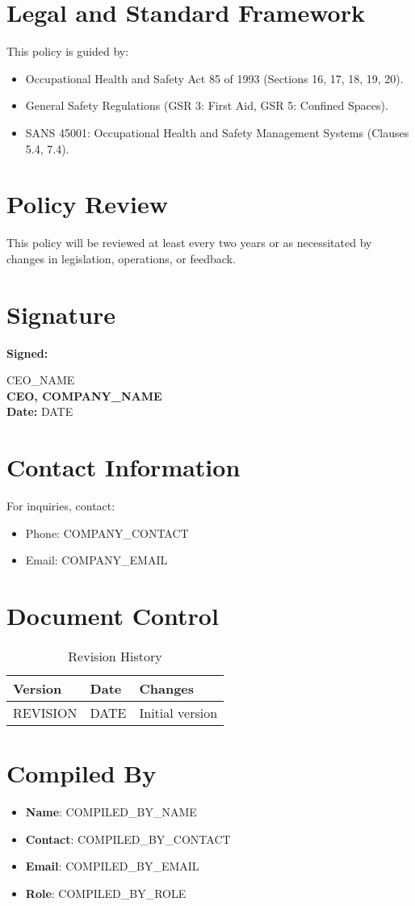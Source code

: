 \documentclass[12pt]{article}
\begin{document}
\section{Legal and Standard Framework}
This policy is guided by:
\begin{itemize}
    \item Occupational Health and Safety Act 85 of 1993 (Sections 16, 17, 18, 19, 20).
    \item General Safety Regulations (GSR 3: First Aid, GSR 5: Confined Spaces).
    \item SANS 45001: Occupational Health and Safety Management Systems (Clauses 5.4, 7.4).
\end{itemize}

\section{Policy Review}
This policy will be reviewed at least every two years or as necessitated by changes in legislation, operations, or feedback.

\section{Signature}
\textbf{Signed:}

{{CEO_NAME}}\\
\textbf{CEO, {{COMPANY_NAME}}}\\
\textbf{Date:} {{DATE}}

\section{Contact Information}
For inquiries, contact:
\begin{itemize}
    \item Phone: {{COMPANY_CONTACT}}
    \item Email: {{COMPANY_EMAIL}}
\end{itemize}

\section{Document Control}
\begin{table}[h]
    \centering
    \begin{tabular}{p{3cm}p{3cm}p{6cm}}
        \toprule
        \textbf{Version} & \textbf{Date} & \textbf{Changes} \\
        \midrule
        {{REVISION}} & {{DATE}} & Initial version \\
        \bottomrule
    \end{tabular}
    \caption{Revision History}
\end{table}

\section{Compiled By}
\begin{itemize}
    \item \textbf{Name}: {{COMPILED_BY_NAME}}
    \item \textbf{Contact}: {{COMPILED_BY_CONTACT}}
    \item \textbf{Email}: {{COMPILED_BY_EMAIL}}
    \item \textbf{Role}: {{COMPILED_BY_ROLE}}
\end{itemize}
\end{document}
